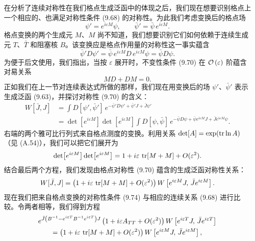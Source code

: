 在分析了连续对称性在我们格点生成泛函中的体现之后，我们现在想要识别格点上一个相应的、也满足对称性条件 (9.68) 的对称性。为此我们考虑变换后的格点场
\begin{equation}
  \psi' = e^{i\varepsilon M}\psi , \qquad
  \bar\psi' = \bar\psi\,e^{i\varepsilon M} .
\end{equation}
格点变换的两个生成元 $M$、$M$ 尚不知道，我们想要识别它们如何依赖于连续生成元 $T$、$\bar T$ 和阻塞核 $B$。该变换应是格点作用量的对称性这一事实蕴含
\begin{equation}
  \bar\psi' D\psi' = \bar\psi\,e^{i\varepsilon M}D\,e^{i\varepsilon M}\psi = \bar\psi D\psi .
\end{equation}
为便于后文使用，我们指出，当按 $\varepsilon$ 展开时，不变性条件 (9.70) 在 $\mathcal{O}\left(\varepsilon\right)$ 阶蕴含对易关系
\begin{equation}
  M D + D M = 0 .
\end{equation}
正如我们在上一节对连续表达式所做的那样，我们现在用变换后的场 $\psi'$、$\bar\psi'$ 表示生成泛函 (9.63)，并探讨对称性 (9.70) 的含义：
\begin{align}
  W[\bar J,J] &= \int D[\psi',\bar\psi']\,e^{-\bar\psi' D\psi' + \bar\psi' J + \bar J\psi'} \nonumber\\
  &= \det\!\left[e^{i\varepsilon M}\right]\det\!\left[e^{i\varepsilon M}\right]
     \int D[\psi,\bar\psi]\,
     e^{-\bar\psi D\psi + \bar\psi e^{i\varepsilon M}J + \bar J e^{i\varepsilon M}\psi} .
\end{align}
右端的两个雅可比行列式来自格点测度的变换。利用关系 $\det[A] = \exp(\operatorname{tr}\ln A)$（见 (A.54)），我们可以把它们展开为
\begin{equation}
  \det\!\left[e^{i\varepsilon M}\right]\det\!\left[e^{i\varepsilon M}\right]
  = 1 + i\varepsilon\,\operatorname{tr}[M + M] + O(\varepsilon^2) .
\end{equation}
结合最后两个方程，我们发现由格点对称性 (9.70) 蕴含的生成泛函对称性关系：
\begin{equation}
  W[\bar J,J] = \left(1 + i\varepsilon\,\operatorname{tr}[M + M] + O(\varepsilon^2)\right)
    W\left[e^{i\varepsilon M}J,\,\bar J e^{i\varepsilon M}\right] .
\end{equation}
现在我们把来自格点变换的对称性条件 (9.74) 与相应的连续关系 (9.68) 进行比较。令两者相等，我们得到方程
\begin{multline}
  e^{\bar J\left(B^{-1} - e^{i\varepsilon T}B^{-1}e^{i\varepsilon T}\right)J}
    \left(1 + i\varepsilon A_{TT} + O(\varepsilon^2)\right)
    W\left[e^{i\varepsilon T}J,\,\bar J e^{i\varepsilon T}\right] \\
  = \left(1 + i\varepsilon\,\operatorname{tr}[M + M] + O(\varepsilon^2)\right)
    W\left[e^{i\varepsilon M}J,\,\bar J e^{i\varepsilon M}\right] ,
\end{multline}
